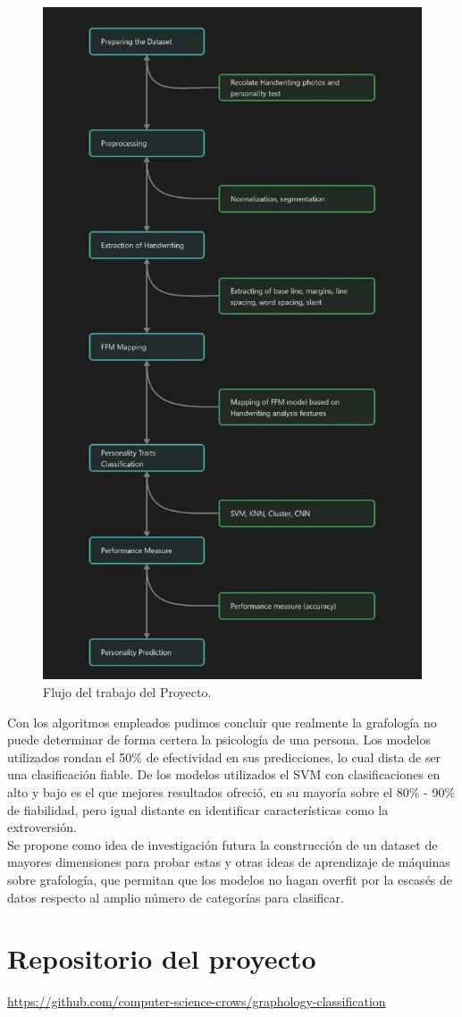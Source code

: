 \documentclass[10pt, a4paper]{article}
\begin{document}
        \begin{figure}[H]
            \centering
            \includegraphics[width = 0.5\linewidth]{photo_2023-05-29_02-40-00.jpg}
            \caption{Flujo del trabajo del Proyecto.}
        \end{figure}

        Con los algoritmos empleados pudimos concluir que realmente la grafolog\'ia no puede determinar de 
        forma certera la psicolog\'ia de una persona. Los modelos utilizados rondan el 50\% de efectividad en sus predicciones, lo cual dista de ser una clasificaci\'on fiable. De los modelos utilizados el SVM con clasificaciones en alto y bajo es el que mejores 
        resultados ofreci\'o, en su mayor\'ia sobre el 80\% - 90\% de fiabilidad, pero igual distante en identificar caracter\'isticas como la extroversi\'on.\\ 

        Se propone como idea de investigaci\'on futura la construcci\'on de un dataset de mayores dimensiones para probar estas y otras ideas de aprendizaje de m\'aquinas sobre grafolog\'ia, que permitan que los modelos no hagan overfit por la escas\'es de datos respecto al amplio n\'umero de categor\'ias para clasificar. 
		
		\section{Repositorio del proyecto}
		\begin{center}
			\small \url{https://github.com/computer-science-crows/graphology-classification}
		\end{center}
		
\end{document}

